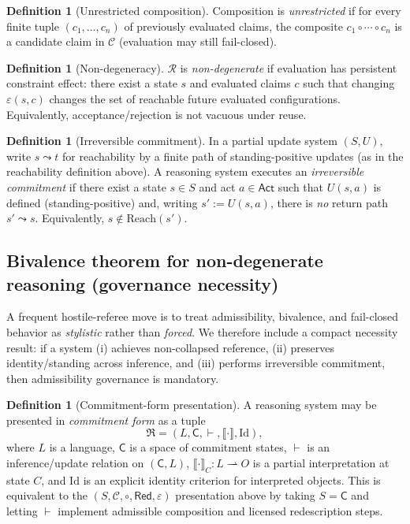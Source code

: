 \documentclass[11pt]{article}
\theoremstyle{definition}
\newtheorem{definition}[theorem]{Definition}
\newcommand{\Act}{\mathsf{Act}}
\newcommand{\Red}{\mathsf{Red}}
\newcommand{\ppar}{\rightharpoonup} %
\begin{document}
\begin{definition}[Unrestricted composition]
\label{def:unrestricted-composition}
Composition is \emph{unrestricted} if for every finite tuple $(c_1,\dots,c_n)$ of previously evaluated claims, the composite $c_1\circ\cdots\circ c_n$ is a candidate claim in $\mathcal{C}$ (evaluation may still fail-closed).
\end{definition}

\begin{definition}[Non-degeneracy]
\label{def:nondegeneracy}
$\mathcal{R}$ is \emph{non-degenerate} if evaluation has persistent constraint effect: there exist a state $s$ and evaluated claims $c$ such that changing $\varepsilon(s,c)$ changes the set of reachable future evaluated configurations.
Equivalently, acceptance/rejection is not vacuous under reuse.
\end{definition}

\begin{definition}[Irreversible commitment]
In a partial update system $(S,U)$, write $s\leadsto t$ for reachability by a finite path of standing-positive updates
(as in the reachability definition above).
A reasoning system executes an \emph{irreversible commitment} if there exist a state $s\in S$ and act $a\in\Act$ such that
$U(s,a)$ is defined (standing-positive) and, writing $s':=U(s,a)$, there is \emph{no} return path $s'\leadsto s$.
Equivalently, $s\notin \mathrm{Reach}(s')$.
\end{definition}

\subsection{Bivalence theorem for non-degenerate reasoning (governance necessity)}
\label{sec:bivalence}

A frequent hostile-referee move is to treat admissibility, bivalence, and fail-closed behavior as \emph{stylistic} rather than \emph{forced}.
We therefore include a compact necessity result: if a system (i) achieves non-collapsed reference, (ii) preserves identity/standing across inference, and (iii) performs irreversible commitment, then admissibility governance is mandatory.

\begin{definition}[Commitment-form presentation]
A reasoning system may be presented in \emph{commitment form} as a tuple
\[
\mathfrak{R}=(L,\mathsf{C},\vdash,\llbracket\cdot\rrbracket,\mathrm{Id}),
\]
where $L$ is a language, $\mathsf{C}$ is a space of commitment states, $\vdash$ is an inference/update relation on $(\mathsf{C},L)$, $\llbracket\cdot\rrbracket_{C}:L\ppar O$ is a partial interpretation at state $C$, and $\mathrm{Id}$ is an explicit identity criterion for interpreted objects.
This is equivalent to the $(S,\mathcal{C},\circ,\Red,\varepsilon)$ presentation above by taking $S=\mathsf{C}$ and letting $\vdash$ implement admissible composition and licensed redescription steps.
\end{definition}
\end{document}
